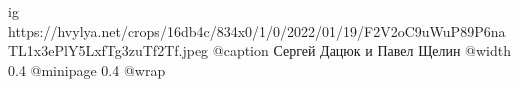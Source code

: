 
 
 
 
 

\ifcmt
  ig https://hvylya.net/crops/16db4c/834x0/1/0/2022/01/19/F2V2oC9uWuP89P6naTL1x3ePlY5LxfTg3zuTf2Tf.jpeg
  @caption Сергей Дацюк и Павел Щелин
  @width 0.4
  @minipage 0.4
  @wrap \parpic[r]
\fi
